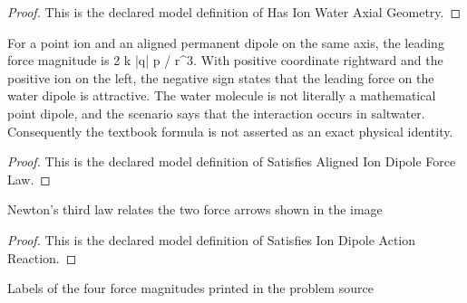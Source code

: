 \begin{proof}
  This is the declared model definition of Has Ion Water Axial Geometry.
\end{proof}
\begin{definition}
  \label{def:physics:phyx-mini-0911:phyxminiproblems-problemphyxmini0911-satisfiesalignediondipoleforcelaw}
  For a point ion and an aligned permanent dipole on the same axis, the leading force magnitude is 2 k |q| p / r\textasciicircum{}3. With positive coordinate rightward and the positive ion on the left, the negative sign states that the leading force on the water dipole is attractive. The water molecule is not literally a mathematical point dipole, and the scenario says that the interaction occurs in saltwater. Consequently the textbook formula is not asserted as an exact physical identity.
\end{definition}
\begin{proof}
  This is the declared model definition of Satisfies Aligned Ion Dipole Force Law.
\end{proof}
\begin{definition}
  \label{def:physics:phyx-mini-0911:phyxminiproblems-problemphyxmini0911-satisfiesiondipoleactionreaction}
  Newton's third law relates the two force arrows shown in the image
\end{definition}
\begin{proof}
  This is the declared model definition of Satisfies Ion Dipole Action Reaction.
\end{proof}
\begin{definition}
  \label{def:physics:phyx-mini-0911:phyxminiproblems-problemphyxmini0911-answerchoice}
  Labels of the four force magnitudes printed in the problem source
\end{definition}
